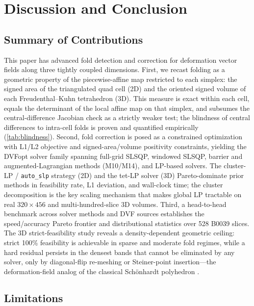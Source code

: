 \documentclass[lettersize,journal]{IEEEtran}
\begin{document}
\section{Discussion and Conclusion}
\label{sec:conclusion}

\subsection{Summary of Contributions}
\label{sec:summary}

This paper has advanced fold detection and correction for deformation vector fields along three tightly coupled dimensions. First, we recast folding as a geometric property of the piecewise-affine map restricted to each simplex: the signed area of the triangulated quad cell (2D) and the oriented signed volume of each Freudenthal--Kuhn tetrahedron (3D). This measure is exact within each cell, equals the determinant of the local affine map on that simplex, and subsumes the central-difference Jacobian check as a strictly weaker test; the blindness of central differences to intra-cell folds is proven and quantified empirically (\autoref{tab:blindness}). Second, fold correction is posed as a constrained optimization with L1/L2 objective and signed-area/volume positivity constraints, yielding the DVFopt solver family spanning full-grid SLSQP, windowed SLSQP, barrier and augmented-Lagrangian methods (M10/M14), and LP-based solvers. The cluster-LP / \texttt{auto\_slp} strategy (2D) and the tet-LP solver (3D) Pareto-dominate prior methods in feasibility rate, L1 deviation, and wall-clock time; the cluster decomposition is the key scaling mechanism that makes global LP tractable on real $320\times456$ and multi-hundred-slice 3D volumes. Third, a head-to-head benchmark across solver methods and DVF sources establishes the speed/accuracy Pareto frontier and distributional statistics over 528 B0039 slices. The 3D strict-feasibility study reveals a density-dependent geometric ceiling: strict 100\% feasibility is achievable in sparse and moderate fold regimes, while a hard residual persists in the densest bands that cannot be eliminated by any solver, only by diagonal-flip re-meshing or Steiner-point insertion---the deformation-field analog of the classical Sch{\"o}nhardt polyhedron \cite{schonhardt1928}.

\subsection{Limitations}
\label{sec:limitations}
\end{document}
